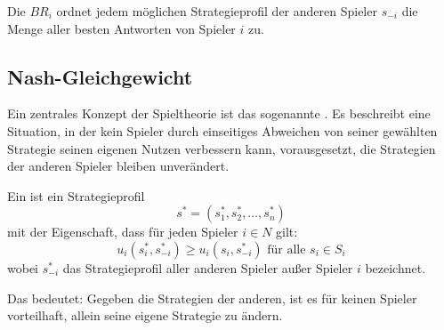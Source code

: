 \begin{definition}
Die  $BR_i$ ordnet jedem möglichen Strategieprofil der anderen Spieler $s_{-i}$ die Menge aller besten Antworten von Spieler $i$ zu.
\end{definition}


\subsection{Nash-Gleichgewicht}

Ein zentrales Konzept der Spieltheorie ist das sogenannte . Es beschreibt eine Situation, in der kein Spieler durch einseitiges Abweichen von seiner gewählten Strategie seinen eigenen Nutzen verbessern kann, vorausgesetzt, die Strategien der anderen Spieler bleiben unverändert.

\begin{definition}
Ein  ist ein Strategieprofil
\[
s^* = (s_1^*, s_2^*, \dots, s_n^*)
\]
mit der Eigenschaft, dass für jeden Spieler $i \in N$ gilt:
\[
u_i(s_i^*, s_{-i}^*) \geq u_i(s_i, s_{-i}^*) \text{ für alle } s_i \in S_i
\]
wobei $s_{-i}^*$ das Strategieprofil aller anderen Spieler außer Spieler $i$ bezeichnet.
\end{definition}

\noindent
Das bedeutet: Gegeben die Strategien der anderen, ist es für keinen Spieler vorteilhaft, allein seine eigene Strategie zu ändern.

